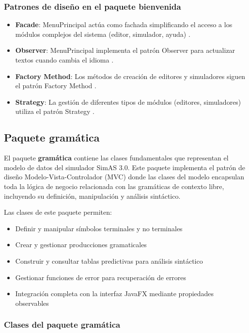 \subsubsection{Patrones de diseño en el paquete bienvenida}

\begin{itemize}
    \item \textbf{Facade}: MenuPrincipal actúa como fachada simplificando el acceso a los módulos complejos del sistema (editor, simulador, ayuda) \cite{gamma1995design}.
    \item \textbf{Observer}: MenuPrincipal implementa el patrón Observer para actualizar textos cuando cambia el idioma \cite{gamma1995design}.
    \item \textbf{Factory Method}: Los métodos de creación de editores y simuladores siguen el patrón Factory Method \cite{gamma1995design}.
    \item \textbf{Strategy}: La gestión de diferentes tipos de módulos (editores, simuladores) utiliza el patrón Strategy \cite{gamma1995design}.
\end{itemize}

\subsection{Paquete gramática}

El paquete \textbf{gramática} contiene las clases fundamentales que representan el modelo de datos del simulador SimAS 3.0. Este paquete implementa el patrón de diseño Modelo-Vista-Controlador (MVC) donde las clases del modelo encapsulan toda la lógica de negocio relacionada con las gramáticas de contexto libre, incluyendo su definición, manipulación y análisis sintáctico.

Las clases de este paquete permiten:
\begin{itemize}
    \item Definir y manipular símbolos terminales y no terminales
    \item Crear y gestionar producciones gramaticales
    \item Construir y consultar tablas predictivas para análisis sintáctico
    \item Gestionar funciones de error para recuperación de errores
    \item Integración completa con la interfaz JavaFX mediante propiedades observables
\end{itemize}

\subsubsection{Clases del paquete gramática}

